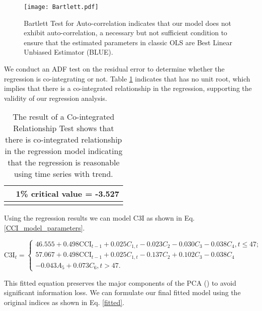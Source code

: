 \documentclass[10pt]{article}
\begin{document}
\begin{figure}[h!]
	\begin{center}
	      \texttt{[image: Bartlett.pdf]}
\caption{ \label{Bartlett} Bartlett Test for Auto-correlation indicates that our model does not exhibit auto-correlation, a necessary but not sufficient condition to ensure that the estimated parameters in classic OLS are Best Linear Unbiased Estimator (BLUE).}
	\end{center}
\end{figure}


We conduct an ADF test on the residual error \cite{Dickey1991} to determine whether the regression is co-integrating or not. Table \ref{ ADF Test to } indicates that   has no unit root, which implies that there is a co-integrated relationship in the regression, supporting the validity of our regression analysis.
 
 
 \begin {table}
 \begin {center}
 \begin {tabular} {ll}
\hline
    &    1\% critical value = -3.527\\
\hline
     &                  \\
\hline
 \end {tabular}
 \caption{The result of a  Co-integrated Relationship Test shows that there is co-integrated relationship in the regression model indicating that the regression is reasonable using time series with trend.}
 \label{ ADF Test to }
 \end{center}
 \end {table}

 
Using the regression results we can model C3I as  shown  in Eq. \ref{CCI_model_parameters}.

\begin {equation}
\mbox{C3I}_t =
 \begin {cases}
46.555+0.498\mbox{CCI}_{t-1}+ 0.025C_{1,t} -0.023C_2-0.030C_3-0.038C_4, t\leq 47; \\
57.067+0.498\mbox{CCI}_{t-1}+ 0.025C_{1,t}-0.137C_2+0.102C_3-0.038C_4\\
-0.043A_5+0.073C_6, t >47. 
\end{cases}
\label{CCI_model_parameters}
\end {equation}

This fitted equation preserves the major components of the PCA () to avoid significant information loss. We can formulate our final fitted model using the original indices as shown in Eq. \ref{fitted}.
\end{document}

